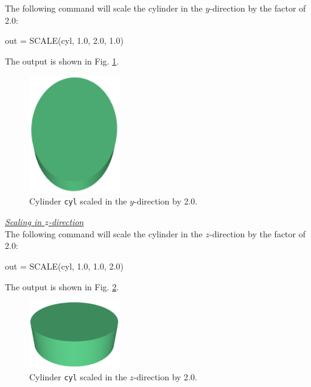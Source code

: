 The following command will 
scale the cylinder in the $y$-direction by the factor of 2.0: 

\begin{bluecode}
out = SCALE(cyl, 1.0, 2.0, 1.0)
\end{bluecode}
The output is shown in Fig. \ref{fig:scale-2}.


\begin{figure}[!ht]
\begin{center}
\includegraphics[width=0.35\textwidth]{img/scale-2.png}
\end{center}
\vspace{-4mm}
\caption{Cylinder {\tt cyl} scaled in the $y$-direction by 2.0.}
\label{fig:scale-2}
\end{figure}

\newpage
\noindent
\underline{\em Scaling in $z$-direction}\\

The following command will 
scale the cylinder in the $z$-direction by the factor of 2.0: 

\begin{bluecode}
out = SCALE(cyl, 1.0, 1.0, 2.0)
\end{bluecode}
The output is shown in Fig. \ref{fig:scale-3}.

\begin{figure}[!ht]
\begin{center}
\includegraphics[width=0.35\textwidth]{img/scale-3.png}
\end{center}
\vspace{-4mm}
\caption{Cylinder {\tt cyl} scaled in the $z$-direction by 2.0.}
\label{fig:scale-3}
\end{figure}

